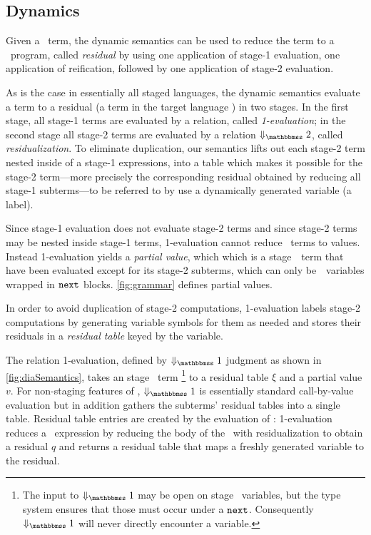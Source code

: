 \subsection{Dynamics}
\label{sec:stagedsemantics}


Given a \lang\ term, the dynamic semantics can be used
to reduce the term to a \langmono\ program, called {\em residual} by
using one application of stage-1 evaluation, one application of
reification, followed by one application of stage-2 evaluation.

As is the case in essentially all staged languages, the dynamic
semantics evaluate a term to a residual (a term in the target
language \langTwo) in two stages. In the first stage, all stage-1
terms are evaluated by a relation, called {\em 1-evaluation}; in the
second stage all stage-2 terms are evaluated by a relation
$\redtwosym$, called {\em residualization}.  To eliminate duplication,
our semantics lifts out each stage-2 term nested inside of a stage-1
expressions, into a table which makes it possible for the stage-2
term---more precisely the corresponding residual obtained by reducing
all stage-1 subterms---to be referred to by use a dynamically
generated variable (a label).



Since stage-1 evaluation does not evaluate stage-2 terms and since
stage-2 terms may be nested inside stage-1 terms, 1-evaluation cannot
reduce \lang\ terms to values.  Instead 1-evaluation yields a {\em
  partial value}, which which is a stage~\bbone\ term that have been
evaluated except for its stage-2 subterms, which can only
be~\bbtwo\ variables wrapped in ${\tt next}$ blocks.  \ref{fig:grammar}
defines partial values.

In order to avoid duplication of stage-2 computations, 1-evaluation
labels stage-2 computations by generating variable symbols for them as
needed and stores their residuals in a {\em residual table} keyed by
the variable.

The relation 1-evaluation, defined by $\redonesym$ judgment as shown
in \ref{fig:diaSemantics}, takes an stage \bbone\ term%
\footnote{ The input to $\redonesym$ may be open on stage \bbtwo\ variables, but
the type system ensures that those must occur under a ${\tt next}$. Consequently
$\redonesym$ will never directly encounter a variable.}
%
to a residual table $\xi$ and a partial value $v$.  For non-staging
features of \lang, $\redonesym$ is essentially standard call-by-value
evaluation but in addition gathers the subterms' residual tables into
a single table. Residual table entries are created by the
evaluation of \next: 1-evaluation reduces a \next\ expression by
reducing the body of the \next\ with residualization to obtain a
residual $q$ and returns a residual table that maps a freshly
generated variable to the residual. 

